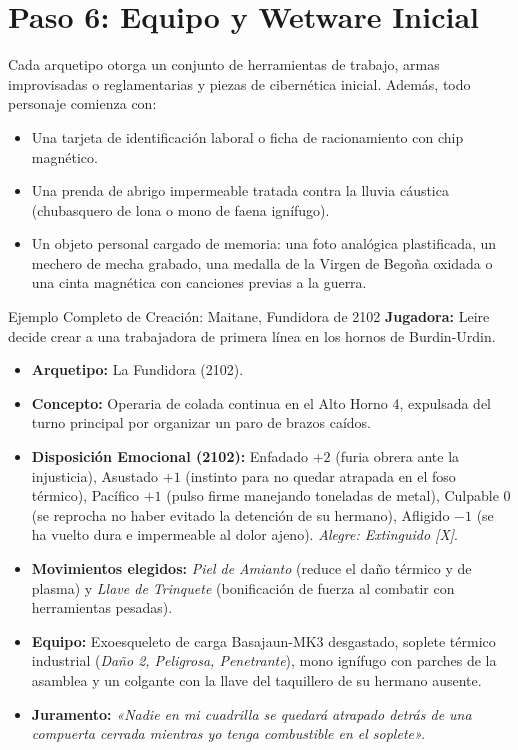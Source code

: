 \section{Paso 6: Equipo y Wetware Inicial}
Cada arquetipo otorga un conjunto de herramientas de trabajo, armas improvisadas o reglamentarias y piezas de cibernética inicial. Además, todo personaje comienza con:
\begin{itemize}
    \item Una tarjeta de identificación laboral o ficha de racionamiento con chip magnético.
    \item Una prenda de abrigo impermeable tratada contra la lluvia cáustica (chubasquero de lona o mono de faena ignífugo).
    \item Un objeto personal cargado de memoria: una foto analógica plastificada, un mechero de mecha grabado, una medalla de la Virgen de Begoña oxidada o una cinta magnética con canciones previas a la guerra.
\end{itemize}

\begin{CajaEjemplo}{Ejemplo Completo de Creación: Maitane, Fundidora de 2102}
\textbf{Jugadora:} Leire decide crear a una trabajadora de primera línea en los hornos de Burdin-Urdin.
\begin{itemize}
    \item \textbf{Arquetipo:} La Fundidora (2102).
    \item \textbf{Concepto:} Operaria de colada continua en el Alto Horno 4, expulsada del turno principal por organizar un paro de brazos caídos.
    \item \textbf{Disposición Emocional (2102):} Enfadado $+2$ (furia obrera ante la injusticia), Asustado $+1$ (instinto para no quedar atrapada en el foso térmico), Pacífico $+1$ (pulso firme manejando toneladas de metal), Culpable $0$ (se reprocha no haber evitado la detención de su hermano), Afligido $-1$ (se ha vuelto dura e impermeable al dolor ajeno). \textit{Alegre: Extinguido [X]}.
    \item \textbf{Movimientos elegidos:} \textit{Piel de Amianto} (reduce el daño térmico y de plasma) y \textit{Llave de Trinquete} (bonificación de fuerza al combatir con herramientas pesadas).
    \item \textbf{Equipo:} Exoesqueleto de carga Basajaun-MK3 desgastado, soplete térmico industrial (\textit{Daño 2, Peligrosa, Penetrante}), mono ignífugo con parches de la asamblea y un colgante con la llave del taquillero de su hermano ausente.
    \item \textbf{Juramento:} \textit{«Nadie en mi cuadrilla se quedará atrapado detrás de una compuerta cerrada mientras yo tenga combustible en el soplete».}
\end{itemize}
\end{CajaEjemplo}
